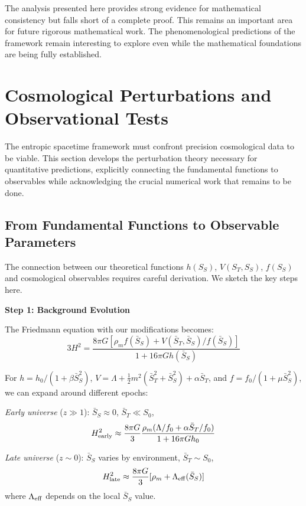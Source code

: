 \documentclass[12pt]{article}
\begin{document}
The analysis presented here provides strong evidence for mathematical consistency but falls short of a complete proof. This remains an important area for future rigorous mathematical work. The phenomenological predictions of the framework remain interesting to explore even while the mathematical foundations are being fully established.

\section{Cosmological Perturbations and Observational Tests}

The entropic spacetime framework must confront precision cosmological data to be viable. This section develops the perturbation theory necessary for quantitative predictions, explicitly connecting the fundamental functions to observables while acknowledging the crucial numerical work that remains to be done.

\subsection{From Fundamental Functions to Observable Parameters}

The connection between our theoretical functions $h(S_S)$, $V(S_T, S_S)$, $f(S_S)$ and cosmological observables requires careful derivation. We sketch the key steps here.

\textbf{Step 1: Background Evolution}

The Friedmann equation with our modifications becomes:
\begin{equation}
    3H^2 = \frac{8\pi G \left[ \rho_m f(\bar{S}_S) + V(\bar{S}_T, \bar{S}_S)/f(\bar{S}_S) \right]}{1 + 16\pi G h(\bar{S}_S)}
\end{equation}

For $h = h_0/(1 + \beta \bar{S}_S^2)$, $V = \Lambda + \frac{1}{2} m^2 (\bar{S}_T^2 + \bar{S}_S^2) + \alpha\bar{S}_T$, and $f = f_0/(1 + \mu \bar{S}_S^2)$, we can expand around different epochs:

\textit{Early universe} ($z \gg 1$): $\bar{S}_S \approx 0$, $\bar{S}_T \ll S_0$,
\begin{equation}
    H^2_{\rm early} \approx \frac{8\pi G}{3} \frac{\rho_m(\Lambda/f_0 + \alpha \bar{S}_T /f_0)}{1 + 16\pi G h_0}
\end{equation}

\textit{Late universe} ($z \sim 0$): $\bar{S}_S$ varies by environment, $\bar{S}_T \sim S_0$,
\begin{equation}
    H^2_{\rm late} \approx \frac{8\pi G}{3} [ \rho_m + \Lambda_{\rm eff}(\bar{S}_S) ]
\end{equation}
where $\Lambda_{\rm eff}$ depends on the local $\bar{S}_S$ value.
\end{document}
